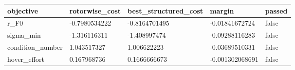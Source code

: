 \begin{tabular}{@{}lllll@{}}
\toprule
objective & rotorwise\_cost & best\_structured\_cost & margin & passed \\
\midrule
r\_F0 & -0.7980534222 & -0.8164701495 & -0.01841672724 & false \\
sigma\_min & -1.316116311 & -1.408997474 & -0.09288116283 & false \\
condition\_number & 1.043517327 & 1.006622223 & -0.03689510331 & false \\
hover\_effort & 0.167968736 & 0.1666666673 & -0.001302068691 & false \\
\bottomrule
\end{tabular}

